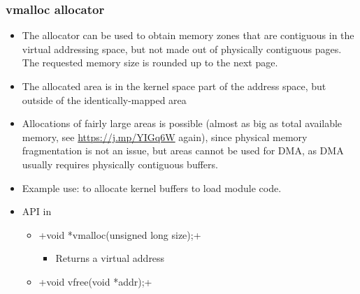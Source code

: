 \begin{frame}[fragile]
  \frametitle{vmalloc allocator}
  \begin{itemize}
  \item The  allocator can be used to obtain
    memory zones that are contiguous in the virtual addressing space,
    but not made out of physically contiguous pages. The
    requested memory size is rounded up to the next page.
  \item The allocated area is in the kernel space part of the address
    space, but outside of the identically-mapped area
  \item Allocations of fairly large areas is possible (almost as big
    as total available memory, see \url{https://j.mp/YIGq6W} again),
    since physical memory fragmentation is not an issue, but areas
    cannot be used for DMA, as DMA usually requires physically
    contiguous buffers.
  \item Example use: to allocate kernel buffers to load module code.
  \item API in 
    \begin{itemize}
    \item {}+void *vmalloc(unsigned long size);+
      \begin{itemize}
      \item Returns a virtual address
      \end{itemize}
    \item {}+void vfree(void *addr);+
    \end{itemize}
  \end{itemize}
\end{frame}

